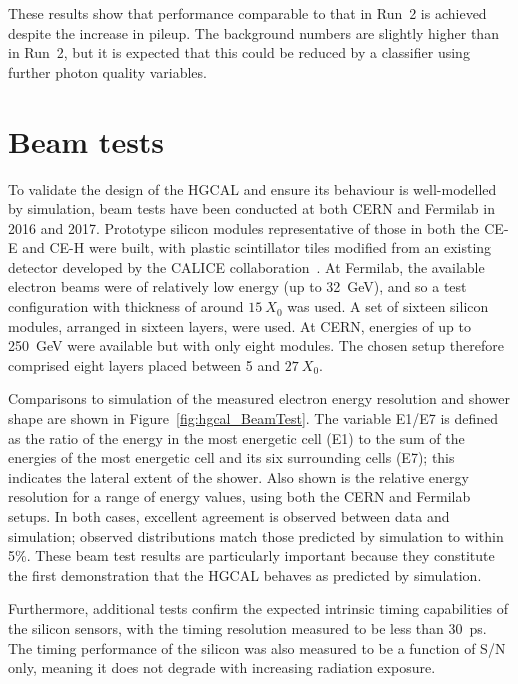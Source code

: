 These results show that performance comparable to that in Run~2 
is achieved despite the increase in pileup.
The background numbers are slightly higher than in Run~2, 
but it is expected that this could be reduced by a classifier using further photon quality variables.

\section{Beam tests}

To validate the design of the HGCAL and ensure its behaviour is well-modelled by simulation, 
beam tests have been conducted at both CERN and Fermilab in 2016 and 2017. 
Prototype silicon modules representative of those in both the CE-E and CE-H were built, 
with plastic scintillator tiles modified from an existing detector 
developed by the CALICE collaboration~\cite{CALICE}.
At Fermilab, the available electron beams were of relatively low energy (up to \SI{32}{GeV}), 
and so a test configuration with thickness of around $\SI{15}{X_0}$ was used.
A set of sixteen silicon modules, arranged in sixteen layers, were used.
At CERN, energies of up to \SI{250}{GeV} were available but with only eight modules.
The chosen setup therefore comprised eight layers placed between 5 and $\SI{27}{X_0}$.

Comparisons to simulation of the measured electron energy resolution 
and shower shape are shown in Figure~\ref{fig:hgcal_BeamTest}.
The variable E1/E7 is defined as the ratio of the energy in the most energetic cell (E1) 
to the sum of the energies of the most energetic cell and its six surrounding cells (E7);
this indicates the lateral extent of the shower.
Also shown is the relative energy resolution for a range of energy values, 
using both the CERN and Fermilab setups.
In both cases, excellent agreement is observed between data and simulation;
observed distributions match those predicted by simulation to within 5\%. 
These beam test results are particularly important because 
they constitute the first demonstration that the HGCAL behaves as predicted by simulation.

Furthermore, additional tests confirm the expected intrinsic timing capabilities of the silicon sensors, 
with the timing resolution measured to be less than \SI{30}{\pico\second}.
The timing performance of the silicon was also measured to be a function of S/N only, 
meaning it does not degrade with increasing radiation exposure. 

